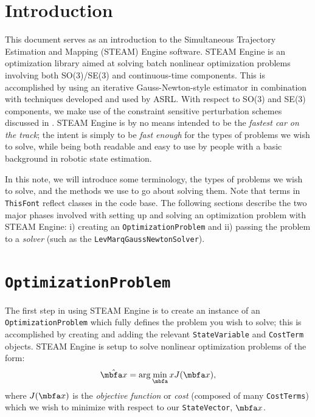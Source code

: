 \documentclass[10pt,letterpaper,fleqn,oneside]{article}
\newcommand{\code}[1]{\texttt{#1}}
\begin{document}
%
%
\section{Introduction}
\label{sec:intro}

This document serves as an introduction to the Simultaneous Trajectory Estimation and Mapping (STEAM) Engine software.
STEAM Engine is an optimization library aimed at solving batch nonlinear optimization problems involving both SO(3)/SE(3) and continuous-time components. 
This is accomplished by using an iterative Gauss-Newton-style estimator in combination with techniques developed and used by ASRL. 
With respect to SO(3) and SE(3) components, we make use of the constraint sensitive perturbation schemes discussed in \citet{barfoot_tro14}.
STEAM Engine is by no means intended to be the \emph{fastest car on the track};
the intent is simply to be \emph{fast enough} for the types of problems we wish to solve, while being both readable and easy to use by people with a basic background in robotic state estimation.

In this note, we will introduce some terminology, the types of problems we wish to solve, and the methods we use to go about solving them. Note that terms in \code{ThisFont} reflect classes in the code base.
The following sections describe the two major phases involved with setting up and solving an optimization problem with STEAM Engine: i) creating an \code{OptimizationProblem} and ii) passing the problem to a \emph{solver} (such as the \code{LevMarqGaussNewtonSolver}).

%
%
\section{\code{OptimizationProblem}}
\label{sec:opt_prob}

The first step in using STEAM Engine is to create an instance of an \code{OptimizationProblem} which fully defines the problem you wish to solve;
this is accomplished by creating and adding the relevant \code{StateVariable} and \code{CostTerm} objects.
STEAM Engine is setup to solve nonlinear optimization problems of the form:
%
\begin{equation}
\label{eq:problem}
\mbfhat{x} = \arg\min_\mbf{x} J(\mbf{x}),
\end{equation}
%
where $J(\mbf{x})$ is the \emph{objective function} or \emph{cost} (composed of many \code{CostTerms}) which we wish to minimize with respect to our \code{StateVector}, $\mbf{x}$. 
\end{document}
